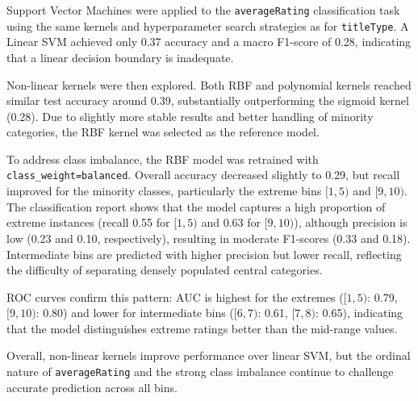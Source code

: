 

Support Vector Machines were applied to the \texttt{averageRating} classification task using the same kernels and hyperparameter search strategies as for \texttt{titleType}.
A Linear SVM achieved only 0.37 accuracy and a macro F1-score of 0.28, indicating that a linear decision boundary is inadequate.

Non-linear kernels were then explored. Both RBF and polynomial kernels reached similar test accuracy around 0.39, substantially outperforming the sigmoid kernel (0.28).
Due to slightly more stable results and better handling of minority categories, the RBF kernel was selected as the reference model.

To address class imbalance, the RBF model was retrained with \texttt{class\_weight=balanced}.
Overall accuracy decreased slightly to 0.29, but recall improved for the minority classes, particularly the extreme bins $[1,5)$ and $[9,10)$.
The classification report shows that the model captures a high proportion of extreme instances (recall 0.55 for $[1,5)$ and 0.63 for $[9,10)$), although precision is low (0.23 and 0.10, respectively), resulting in moderate F1-scores (0.33 and 0.18).
Intermediate bins are predicted with higher precision but lower recall, reflecting the difficulty of separating densely populated central categories.

ROC curves
confirm this pattern: AUC is highest for the extremes ($[1,5)$: 0.79, $[9,10)$: 0.80) and lower for intermediate bins ($[6,7)$: 0.61, $[7,8)$: 0.65), indicating that the model distinguishes extreme ratings better than the mid-range values.

Overall, non-linear kernels improve performance over linear SVM, but the ordinal nature of \texttt{averageRating} and the strong class imbalance continue to challenge accurate prediction across all bins.


